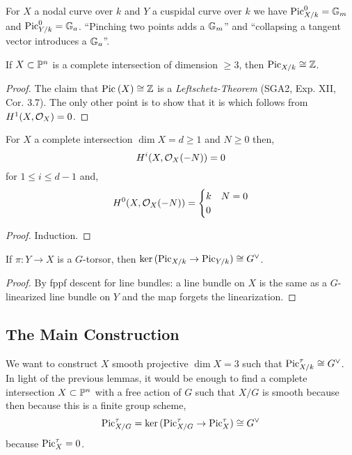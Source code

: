 \documentclass[12pt]{article}
\begin{document}
\begin{example}
For $X$ a nodal curve over $k$ and $Y$ a cuspidal curve over $k$ we have $\mathrm{Pic}^0_{X/k} = \Gm$ and $\mathrm{Pic}^0_{Y/k} = \Ga$. ``Pinching two points adds a $\Gm$'' and ``collapsing a tangent vector introduces a $\Ga$''. 
\end{example}

\begin{lemma}
If $X \subset \P^n$ is a complete intersection of dimension $\ge 3$, then $\fPic_{X/k} \cong \Z$. 
\end{lemma}

\begin{proof}
The claim that $\Pic{X} \cong \Z$ is a \textit{Leftschetz-Theorem} (SGA2, Exp. XII, Cor. 3.7). The only other point is to show that it is \etale which follows from $H^1(X, \struct{X}) = 0$. 
\end{proof}

\begin{prop}
For $X$ a complete intersection $\dim{X} = d \ge 1$ and $N \ge 0$ then,
\[ H^i(X, \struct{X}(-N)) = 0 \]
for $1 \le i \le d - 1$ and,
\[ H^0(X, \struct{X}(-N)) = 
\begin{cases}
k & N = 0 
\\
0
\end{cases} \]
\end{prop}

\begin{proof}
Induction.
\end{proof}

\begin{lemma}
If $\pi : Y \to X$ is a $G$-torsor, then $\ker{(\fPic_{X/k} \to \fPic_{Y/k})} \cong G^\vee$.
\end{lemma}

\begin{proof}
By fppf descent for line bundles: a line bundle on $X$ is the same as a $G$-linearized line bundle on $Y$ and the map forgets the linearization. 
\end{proof}

\subsection{The Main Construction}

We want to construct $X$ smooth projective $\dim{X} = 3$ such that $\fPic^\tau_{X/k} \cong G^\vee$. In light of the previous lemmas, it would be enough to find a complete intersection $X \subset \P^n$ with a free action of $G$ such that $X / G$ is smooth because then because this is a finite group scheme,
\[ \fPic^\tau_{X/G} = \ker{(\fPic^\tau_{X/G} \to \fPic^\tau_{X})} \cong G^\vee \]
because $\fPic^\tau_X = 0$. 
\end{document}

